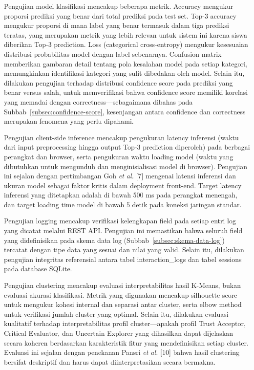 \documentclass[12pt,oneside]{report}
\begin{document}
Pengujian model klasifikasi mencakup beberapa metrik. Accuracy mengukur proporsi prediksi yang benar dari total prediksi pada test set. Top-3 accuracy mengukur proporsi di mana label yang benar termasuk dalam tiga prediksi teratas, yang merupakan metrik yang lebih relevan untuk sistem ini karena siswa diberikan Top-3 prediction. Loss (categorical cross-entropy) mengukur kesesuaian distribusi probabilitas model dengan label sebenarnya. Confusion matrix memberikan gambaran detail tentang pola kesalahan model pada setiap kategori, memungkinkan identifikasi kategori yang sulit dibedakan oleh model. Selain itu, dilakukan pengujian terhadap distribusi confidence score pada prediksi yang benar versus salah, untuk memverifikasi bahwa confidence score memiliki korelasi yang memadai dengan correctness—sebagaimana dibahas pada Subbab~\ref{subsec:confidence-score}, kesenjangan antara confidence dan correctness merupakan fenomena yang perlu dipahami.

Pengujian client-side inference mencakup pengukuran latency inferensi (waktu dari input preprocessing hingga output Top-3 prediction diperoleh) pada berbagai perangkat dan browser, serta pengukuran waktu loading model (waktu yang dibutuhkan untuk mengunduh dan menginisialisasi model di browser). Pengujian ini sejalan dengan pertimbangan Goh \textit{et al.} [7] mengenai latensi inferensi dan ukuran model sebagai faktor kritis dalam deployment front-end. Target latency inferensi yang ditetapkan adalah di bawah 500 ms pada perangkat menengah, dan target loading time model di bawah 5 detik pada koneksi jaringan standar.

Pengujian logging mencakup verifikasi kelengkapan field pada setiap entri log yang dicatat melalui REST API. Pengujian ini memastikan bahwa seluruh field yang didefinisikan pada skema data log (Subbab~\ref{subsec:skema-data-log}) tercatat dengan tipe data yang sesuai dan nilai yang valid. Selain itu, dilakukan pengujian integritas referensial antara tabel interaction\_logs dan tabel sessions pada database SQLite.

Pengujian clustering mencakup evaluasi interpretabilitas hasil K-Means, bukan evaluasi akurasi klasifikasi. Metrik yang digunakan mencakup silhouette score untuk mengukur kohesi internal dan separasi antar cluster, serta elbow method untuk verifikasi jumlah cluster yang optimal. Selain itu, dilakukan evaluasi kualitatif terhadap interpretabilitas profil cluster—apakah profil Trust Acceptor, Critical Evaluator, dan Uncertain Explorer yang dihasilkan dapat dijelaskan secara koheren berdasarkan karakteristik fitur yang mendefinisikan setiap cluster. Evaluasi ini sejalan dengan penekanan Pansri \textit{et al.} [10] bahwa hasil clustering bersifat deskriptif dan harus dapat diinterpretasikan secara bermakna.
\end{document}
